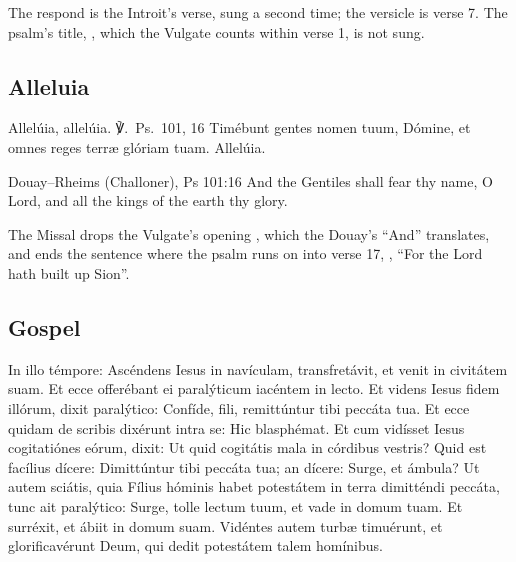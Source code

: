 \noindent The respond is the Introit's verse, sung a second time; the versicle
is verse 7. The psalm's title, , which the Vulgate
counts within verse 1, is not sung.

\subsection{Alleluia}
\label{proper-alleluia}


\begin{latinproper}
Allelúia, allelúia. ℣.~\textnormal{Ps.\ 101, 16} Timébunt gentes nomen tuum,
Dómine, et omnes reges terræ glóriam tuam. Allelúia.
\end{latinproper}

\begin{englishwitness}{Douay--Rheims (Challoner), Ps 101:16}
And the Gentiles shall fear thy name, O Lord, and all the kings of the earth
thy glory.
\end{englishwitness}

\noindent The Missal drops the Vulgate's opening , which the Douay's
``And'' translates, and ends the sentence where the psalm runs on into verse
17, , ``For the Lord hath built up Sion''.

\subsection{Gospel}
\label{proper-gospel}


\begin{latinproper}
In illo témpore: Ascéndens Iesus in navículam, transfretávit, et venit in
civitátem suam. Et ecce offerébant ei paralýticum iacéntem in lecto. Et videns
Iesus fidem illórum, dixit paralýtico: Confíde, fili, remittúntur tibi peccáta
tua. Et ecce quidam de scribis dixérunt intra se: Hic blasphémat. Et cum
vidísset Iesus cogitatiónes eórum, dixit: Ut quid cogitátis mala in córdibus
vestris? Quid est facílius dícere: Dimittúntur tibi peccáta tua; an dícere:
Surge, et ámbula? Ut autem sciátis, quia Fílius hóminis habet potestátem in
terra dimitténdi peccáta, tunc ait paralýtico: Surge, tolle lectum tuum, et
vade in domum tuam. Et surréxit, et ábiit in domum suam. Vidéntes autem turbæ
timuérunt, et glorificavérunt Deum, qui dedit potestátem talem homínibus.
\end{latinproper}

